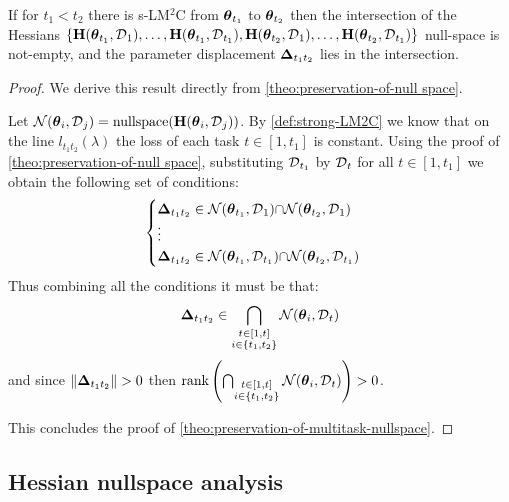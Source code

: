 \documentclass{article} %
\newcommand{\hessian}{\vH}
\newcommand{\rank}{\mbox{rank}}
\begin{document}
\vspace{0.2cm}
\begin{thm}
\label{theo:preservation-of-multitask-nullspace}
    If for $t_1 < t_2$ there is s-LM$^2$C from $\mbox{$\mbox{$\boldsymbol{\theta}$}$}_{t_1}$ to $\mbox{$\mbox{$\boldsymbol{\theta}$}$}_{t_2}$ then the intersection of the Hessians $\{\hessian(\vparam_{t_1}, \data_{1}),\dots, \hessian(\vparam_{t_1}, \data_{t_1}),\hessian(\vparam_{t_2}, \data_{1}),\dots,\hessian(\vparam_{t_2}, \data_{t_1})\}$ null-space is not-empty, and the parameter displacement $\mbox{$\mbox{$\boldsymbol{\Delta}$}$}_{t_1t_2}$ lies in the intersection.
\end{thm}
\begin{proof}
    We derive this result directly from \cref{theo:preservation-of-null space}. 

    Let $\mathcal{N}(\vparam_{i}, \data_{j}) = \nullspace(\hessian(\vparam_{i}, \data_{j}))$.
    By \cref{def:strong-LM2C} we know that on the line $l_{t_1t_2}(\lambda)$ the loss of each task $t\in[1,t_1]$ is constant. Using the proof of \cref{theo:preservation-of-null space}, substituting $\mbox{${\cal D}$}_{t_1}$ by $\mbox{${\cal D}$}_t$ for all $t\in[1,t_1]$ we obtain the following set of conditions:
\begin{equation*}
    \begin{cases}
        \mbox{$\mbox{$\boldsymbol{\Delta}$}$}_{t_1t_2} \in \mathcal{N}(\mbox{$\mbox{$\boldsymbol{\theta}$}$}_{t_1}, \mbox{${\cal D}$}_{1}) \mbox{$\cap$} \mathcal{N}(\mbox{$\mbox{$\boldsymbol{\theta}$}$}_{t_2}, \mbox{${\cal D}$}_{1}) \\
        \vdots \\
        \mbox{$\mbox{$\boldsymbol{\Delta}$}$}_{t_1t_2} \in \mathcal{N}(\mbox{$\mbox{$\boldsymbol{\theta}$}$}_{t_1}, \mbox{${\cal D}$}_{t_1}) \mbox{$\cap$} \mathcal{N}(\mbox{$\mbox{$\boldsymbol{\theta}$}$}_{t_2}, \mbox{${\cal D}$}_{t_1})
    \end{cases}
\end{equation*}
Thus combining all the conditions it must be that:
\begin{equation}
    \mbox{$\mbox{$\boldsymbol{\Delta}$}$}_{t_1t_2} \in \bigcap_{\substack{t \in [1,t] \\ i \in \{t_1, t_2\}}} \mathcal{N}(\mbox{$\mbox{$\boldsymbol{\theta}$}$}_{i}, \mbox{${\cal D}$}_{t})
\end{equation}
and since $\|\vDelta_{t_1t_2}\|>0$ then $\rank\rnd{\bigcap_{\substack{t \in [1,t] \\ i \in \{t_1, t_2\}}} \mathcal{N}(\vparam_{i}, \data_{t})} > 0$. 

This concludes the proof of \cref{theo:preservation-of-multitask-nullspace}.
\end{proof}

\subsection{Hessian nullspace analysis}
\end{document}
